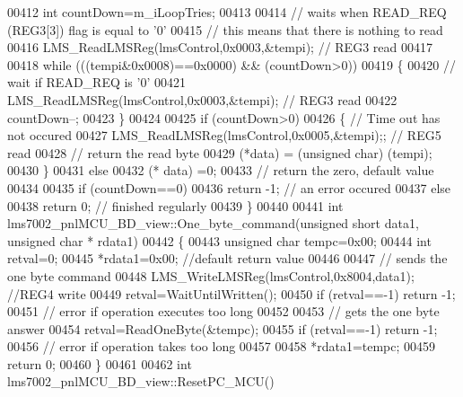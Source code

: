 \begin{DoxyCode}
{{{{{{{00412     \textcolor{keywordtype}{int} countDown=m_iLoopTries;
00413 
00414      \textcolor{comment}{// waits when READ\_REQ (REG3[3]) flag is equal to '0'}
00415      \textcolor{comment}{// this means that there is nothing to read}
00416     LMS_ReadLMSReg(lmsControl,0x0003,&tempi); \textcolor{comment}{// REG3 read}
00417 
00418     \textcolor{keywordflow}{while} (((tempi&0x0008)==0x0000) && (countDown>0))
00419     \{
00420         \textcolor{comment}{// wait if READ\_REQ is '0'}
00421         LMS_ReadLMSReg(lmsControl,0x0003,&tempi); \textcolor{comment}{// REG3 read}
00422         countDown--;
00423     \}
00424 
00425     \textcolor{keywordflow}{if} (countDown>0)
00426     \{ \textcolor{comment}{// Time out has not occured}
00427         LMS_ReadLMSReg(lmsControl,0x0005,&tempi);; \textcolor{comment}{// REG5 read}
00428         \textcolor{comment}{// return the read byte}
00429         (*data) = (\textcolor{keywordtype}{unsigned} char) (tempi);
00430     \}
00431     \textcolor{keywordflow}{else}
00432         (* data) =0;
00433      \textcolor{comment}{// return the zero, default value}
00434 
00435     \textcolor{keywordflow}{if} (countDown==0)
00436         \textcolor{keywordflow}{return} -1; \textcolor{comment}{// an error occured}
00437     \textcolor{keywordflow}{else}
00438         \textcolor{keywordflow}{return} 0; \textcolor{comment}{// finished regularly}
00439 \}
00440 
00441 \textcolor{keywordtype}{int} lms7002_pnlMCU_BD_view::One_byte_command(\textcolor{keywordtype}{unsigned} \textcolor{keywordtype}{short} data1, \textcolor{keywordtype}{unsigned} \textcolor{keywordtype}{char} * rdata1)
00442 \{
00443     \textcolor{keywordtype}{unsigned} \textcolor{keywordtype}{char} tempc=0x00;
00444     \textcolor{keywordtype}{int} retval=0;
00445     *rdata1=0x00; \textcolor{comment}{//default return value}
00446 
00447     \textcolor{comment}{// sends the one byte command}
00448         LMS_WriteLMSReg(lmsControl,0x8004,data1); \textcolor{comment}{//REG4 write}
00449     retval=WaitUntilWritten();
00450     \textcolor{keywordflow}{if} (retval==-1) \textcolor{keywordflow}{return} -1;
00451     \textcolor{comment}{// error if operation executes too long}
00452 
00453     \textcolor{comment}{// gets the one byte answer}
00454     retval=ReadOneByte(&tempc);
00455     \textcolor{keywordflow}{if} (retval==-1) \textcolor{keywordflow}{return} -1;
00456     \textcolor{comment}{// error if operation takes too long}
00457 
00458     *rdata1=tempc;
00459     \textcolor{keywordflow}{return} 0;
00460 \}
00461 
00462 \textcolor{keywordtype}{int} lms7002_pnlMCU_BD_view::ResetPC_MCU()
}}}}}}}
\end{DoxyCode}
